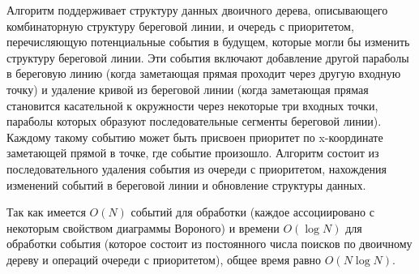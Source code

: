 Алгоритм поддерживает структуру данных двоичного дерева, описывающего комбинаторную структуру береговой линии, и очередь с приоритетом, перечисляющую потенциальные события в будущем, которые могли бы изменить структуру береговой линии. Эти события включают добавление другой параболы в береговую линию (когда заметающая прямая проходит через другую входную точку) и удаление кривой из береговой линии (когда заметающая прямая становится касательной к окружности через некоторые три входных точки, параболы которых образуют последовательные сегменты береговой линии). Каждому такому событию может быть присвоен приоритет по x-координате заметающей прямой в точке, где событие произошло. Алгоритм состоит из последовательного удаления события из очереди с приоритетом, нахождения изменений событий в береговой линии и обновление структуры данных.

Так как имеется $O(N)$ событий для обработки (каждое ассоциировано с некоторым свойством диаграммы Вороного) и времени $O(\log N)$ для обработки события (которое состоит из постоянного числа поисков по двоичному дереву и операций очереди с приоритетом), общее время равно $O(N \log N)$.

